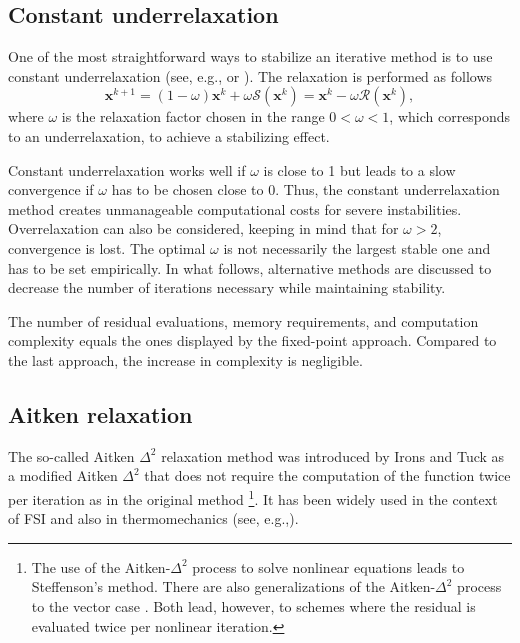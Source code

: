           \subsection{Constant underrelaxation} \label{sec:underrelaxation}

          One of the most straightforward ways to stabilize an iterative method is to use constant underrelaxation (see, e.g., \cite{erbts_accelerated_2012} or \cite{gatzhammer_efficient_2014}).
          The relaxation is performed as follows
          \begin{equation} \label{eq:constant_relaxation}
            \mathbf{x}^{k+1}=(1-\omega) \mathbf{x}^{k}+\omega\bm{\mathcal{S}}(\mathbf{x}^k)=\mathbf{x}^{k} -\omega \bm{\mathcal{R}}(\mathbf{x}^k),
          \end{equation}
          where \(\omega\) is the relaxation factor chosen in the range \(0<\omega<1\), which corresponds to an underrelaxation, to achieve a stabilizing effect.

          Constant underrelaxation works well if \(\omega\) is close to 1 but leads to a slow convergence if \(\omega\) has to be chosen close to 0.
          Thus, the constant underrelaxation method creates unmanageable computational costs for severe instabilities.
          Overrelaxation can also be considered, keeping in mind that for \(\omega > 2\), convergence is lost.
          The optimal \(\omega\) is not necessarily the largest stable one \citep{gatzhammer_efficient_2014} and has to be set empirically.
          In what follows, alternative methods are discussed to decrease the number of iterations necessary while maintaining stability.

          The number of residual evaluations, memory requirements, and computation complexity equals the ones displayed by the fixed-point approach.
          Compared to the last approach, the increase in complexity is negligible.

          \subsection{Aitken relaxation} \label{sec:aitken_relaxation}


          The so-called Aitken \(\Delta^2\) relaxation method was introduced by Irons and Tuck \citep{irons_version_1969} as a modified Aitken \(\Delta^2\) that does not require the computation of the function twice per iteration as in the original method \footnote{The use of the Aitken-\(\Delta^2\) process to solve nonlinear equations leads to Steffenson's method. There are also generalizations of the Aitken-\(\Delta^2\) process to the vector case \citep{sidi_vector_2017}. Both lead, however, to schemes where the residual is evaluated twice per nonlinear iteration.}.
          It has been widely used in the context of FSI \citep{irons_version_1969, kuttler_fixed-point_2008, joosten_analysis_2009, kuttler_vector_2009} and also in thermomechanics (see, e.g.,\cite{erbts_accelerated_2012, danowski_computational_2014, erbts_partitioned_2015, wendt_partitioned_2015}).

